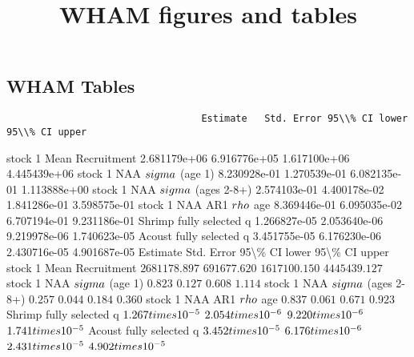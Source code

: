 \documentclass[
]{article}
\title{WHAM figures and tables}
\author{}
\date{\vspace{-2.5em}}
\begin{document}
\maketitle

\subsection{WHAM Tables}\label{wham-tables}

\begin{verbatim}
                                  Estimate   Std. Error 95\\% CI lower 95\\% CI upper
\end{verbatim}

stock 1 Mean Recruitment 2.681179e+06 6.916776e+05 1.617100e+06
4.445439e+06 stock 1 NAA \(\\sigma\) (age 1) 8.230928e-01 1.270539e-01
6.082135e-01 1.113888e+00 stock 1 NAA \(\\sigma\) (ages 2-8+)
2.574103e-01 4.400178e-02 1.841286e-01 3.598575e-01 stock 1 NAA AR1
\(\\rho\) age 8.369446e-01 6.095035e-02 6.707194e-01 9.231186e-01 Shrimp
fully selected q 1.266827e-05 2.053640e-06 9.219978e-06 1.740623e-05
Acoust fully selected q 3.451755e-05 6.176230e-06 2.430716e-05
4.901687e-05 Estimate Std. Error 95\textbackslash\% CI lower
95\textbackslash\% CI upper stock 1 Mean Recruitment \(2681178.897\)
\(691677.620\) \(1617100.150\) \(4445439.127\) stock 1 NAA \(\\sigma\)
(age 1) \(0.823\) \(0.127\) \(0.608\) \(1.114\) stock 1 NAA \(\\sigma\)
(ages 2-8+) \(0.257\) \(0.044\) \(0.184\) \(0.360\) stock 1 NAA AR1
\(\\rho\) age \(0.837\) \(0.061\) \(0.671\) \(0.923\) Shrimp fully
selected q \(1.267\\times 10^{-5}\) \(2.054\\times 10^{-6}\)
\(9.220\\times 10^{-6}\) \(1.741\\times 10^{-5}\) Acoust fully selected
q \(3.452\\times 10^{-5}\) \(6.176\\times 10^{-6}\)
\(2.431\\times 10^{-5}\) \(4.902\\times 10^{-5}\)
\end{document}
